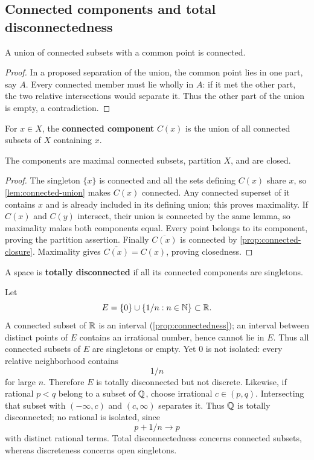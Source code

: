 \subsection{Connected components and total disconnectedness}
\begin{lemma}\label{lem:connected-union}
A union of connected subsets with a common point is connected.
\end{lemma}
\begin{proof}
In a proposed separation of the union, the common point lies in one
part, say $A$. Every connected member must lie wholly in $A$: if it met
the other part, the two relative intersections would separate it.
Thus the other part of the union is empty, a contradiction.
\end{proof}
\begin{definition}\label{def:connected-component}
For $x\in X$, the \textbf{connected component} $C(x)$ is the union of
all connected subsets of $X$ containing $x$.
\end{definition}
\begin{proposition}\label{prop:connected-components}
The components are maximal connected subsets, partition $X$, and are closed.
\end{proposition}
\begin{proof}
The singleton $\{x\}$ is connected and all the sets defining $C(x)$ share
$x$, so \cref{lem:connected-union} makes $C(x)$ connected. Any connected
superset of it contains $x$ and is already included in its defining union;
this proves maximality. If $C(x)$ and $C(y)$ intersect, their union is
connected by the same lemma, so maximality makes both components equal.
Every point belongs to its component, proving the partition assertion.
Finally $\overline{C(x)}$ is connected by \cref{prop:connected-closure}.
Maximality gives $\overline{C(x)}=C(x)$, proving closedness.
\end{proof}
\begin{definition}\label{def:totally-disconnected}
A space is \textbf{totally disconnected} if all its connected components
are singletons.
\end{definition}
\begin{example}
Let
\[
E=\{0\}\cup\{1/n:n\in\mathbb N\}\subset\mathbb{R}.
\]
 A connected subset
of $\mathbb{R}$ is an interval (\cref{prop:connectedness}); an interval between
distinct points of $E$ contains an irrational number, hence cannot lie
in $E$. Thus all connected subsets of $E$ are singletons or empty.
Yet $0$ is not isolated: every relative neighborhood contains
\[
1/n
\]
 for
large $n$. Therefore $E$ is totally disconnected but not discrete.
Likewise, if rational $p<q$ belong to a subset of $\mathbb{Q}$, choose irrational
$c\in(p,q)$. Intersecting that subset with $(-\infty,c)$ and $(c,\infty)$
separates it. Thus $\mathbb{Q}$ is totally disconnected; no rational is isolated,
since
\[
p+1/n\to p
\]
 with distinct rational terms. Total disconnectedness
concerns connected subsets, whereas discreteness concerns open singletons.
\end{example}


